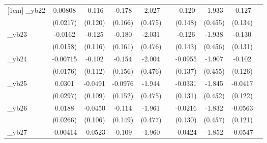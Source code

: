 \begin{table}[htbp]
\begin{tabular}{l*{9}{c}}
[1em]
\_yb22       &     0.00808         &      -0.116         &      -0.178         &      -2.027\sym{***}&                     &      -0.120         &      -1.933\sym{***}&      -0.127         &                     \\
            &    (0.0217)         &     (0.120)         &     (0.166)         &     (0.475)         &                     &     (0.148)         &     (0.455)         &     (0.134)         &                     \\
[1em]
\_yb23       &     -0.0162         &      -0.125         &      -0.180         &      -2.031\sym{***}&                     &      -0.126         &      -1.938\sym{***}&      -0.130         &                     \\
            &    (0.0158)         &     (0.116)         &     (0.161)         &     (0.476)         &                     &     (0.143)         &     (0.456)         &     (0.131)         &                     \\
[1em]
\_yb24       &    -0.00715         &      -0.102         &      -0.154         &      -2.004\sym{***}&                     &     -0.0955         &      -1.907\sym{***}&      -0.102         &                     \\
            &    (0.0176)         &     (0.112)         &     (0.156)         &     (0.476)         &                     &     (0.137)         &     (0.455)         &     (0.126)         &                     \\
[1em]
\_yb25       &      0.0301         &     -0.0491         &     -0.0976         &      -1.944\sym{***}&                     &     -0.0331         &      -1.845\sym{***}&     -0.0417         &                     \\
            &    (0.0297)         &     (0.109)         &     (0.152)         &     (0.475)         &                     &     (0.131)         &     (0.452)         &     (0.122)         &                     \\
[1em]
\_yb26       &      0.0188         &     -0.0450         &      -0.114         &      -1.961\sym{***}&                     &     -0.0216         &      -1.832\sym{***}&     -0.0563         &                     \\
            &    (0.0266)         &     (0.106)         &     (0.149)         &     (0.477)         &                     &     (0.130)         &     (0.457)         &     (0.121)         &                     \\
[1em]
\_yb27       &    -0.00414         &     -0.0523         &      -0.109         &      -1.960\sym{***}&                     &     -0.0424         &      -1.852\sym{***}&     -0.0547         &                     \\

\end{tabular}
\end{table}
